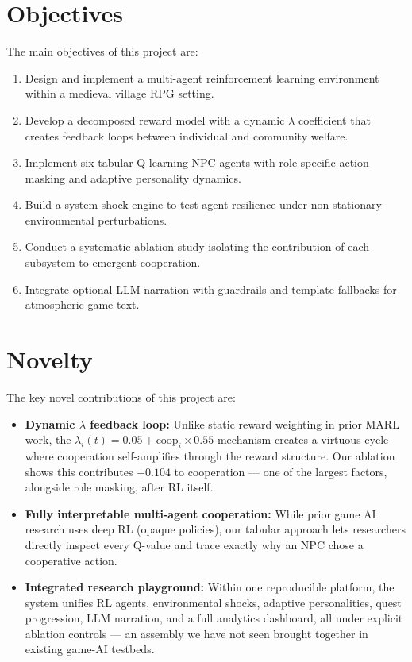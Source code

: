 \documentclass[12pt, a4paper, oneside]{report}
\begin{document}
\section{Objectives}
\label{sec:objectives}

The main objectives of this project are:

\begin{enumerate}
    \item Design and implement a multi-agent reinforcement learning environment within a medieval village RPG setting.
    \item Develop a decomposed reward model with a dynamic $\lambda$ coefficient that creates feedback loops between individual and community welfare.
    \item Implement six tabular Q-learning NPC agents with role-specific action masking and adaptive personality dynamics.
    \item Build a system shock engine to test agent resilience under non-stationary environmental perturbations.
    \item Conduct a systematic ablation study isolating the contribution of each subsystem to emergent cooperation.
    \item Integrate optional LLM narration with guardrails and template fallbacks for atmospheric game text.
\end{enumerate}

\section{Novelty}
\label{sec:novelty}

The key novel contributions of this project are:

\begin{itemize}
    \item \textbf{Dynamic $\lambda$ feedback loop:} Unlike static reward weighting in prior MARL work, the $\lambda_i(t) = 0.05 + \text{coop}_i \times 0.55$ mechanism creates a virtuous cycle where cooperation self-amplifies through the reward structure. Our ablation shows this contributes $+0.104$ to cooperation --- one of the largest factors, alongside role masking, after RL itself.
    \item \textbf{Fully interpretable multi-agent cooperation:} While prior game AI research uses deep RL (opaque policies), our tabular approach lets researchers directly inspect every Q-value and trace exactly why an NPC chose a cooperative action.
    \item \textbf{Integrated research playground:} Within one reproducible platform, the system unifies RL agents, environmental shocks, adaptive personalities, quest progression, LLM narration, and a full analytics dashboard, all under explicit ablation controls --- an assembly we have not seen brought together in existing game-AI testbeds.
\end{itemize}
\end{document}
